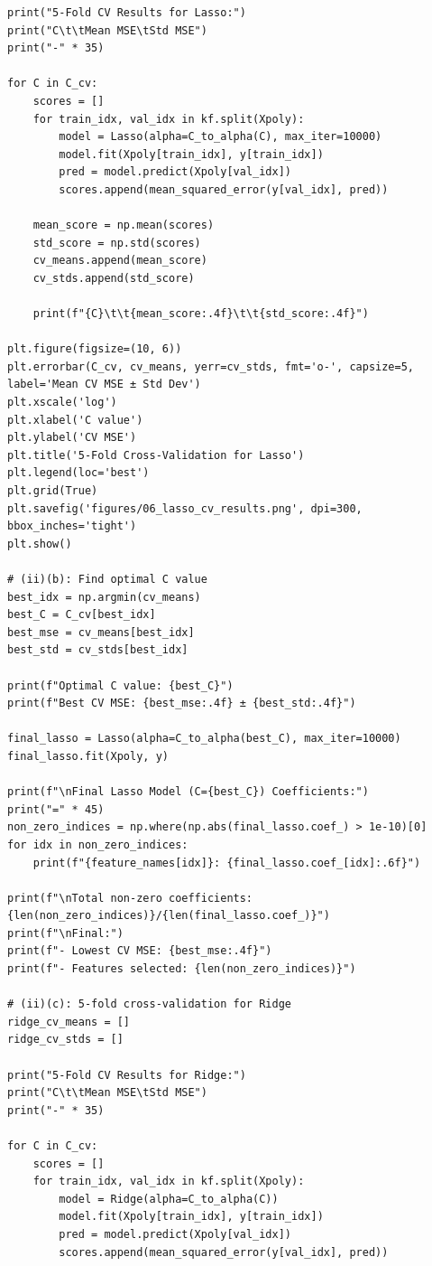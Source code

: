 \documentclass[11pt,a4paper]{article}
\begin{document}
\begin{lstlisting}
print("5-Fold CV Results for Lasso:")
print("C\t\tMean MSE\tStd MSE")
print("-" * 35)

for C in C_cv:
    scores = []
    for train_idx, val_idx in kf.split(Xpoly):
        model = Lasso(alpha=C_to_alpha(C), max_iter=10000)
        model.fit(Xpoly[train_idx], y[train_idx])
        pred = model.predict(Xpoly[val_idx])
        scores.append(mean_squared_error(y[val_idx], pred))
    
    mean_score = np.mean(scores)
    std_score = np.std(scores)
    cv_means.append(mean_score)
    cv_stds.append(std_score)
    
    print(f"{C}\t\t{mean_score:.4f}\t\t{std_score:.4f}")

plt.figure(figsize=(10, 6))
plt.errorbar(C_cv, cv_means, yerr=cv_stds, fmt='o-', capsize=5, label='Mean CV MSE ± Std Dev')
plt.xscale('log')
plt.xlabel('C value')
plt.ylabel('CV MSE')
plt.title('5-Fold Cross-Validation for Lasso')
plt.legend(loc='best')
plt.grid(True)
plt.savefig('figures/06_lasso_cv_results.png', dpi=300, bbox_inches='tight')
plt.show()

# (ii)(b): Find optimal C value
best_idx = np.argmin(cv_means)
best_C = C_cv[best_idx]
best_mse = cv_means[best_idx]
best_std = cv_stds[best_idx]

print(f"Optimal C value: {best_C}")
print(f"Best CV MSE: {best_mse:.4f} ± {best_std:.4f}")

final_lasso = Lasso(alpha=C_to_alpha(best_C), max_iter=10000)
final_lasso.fit(Xpoly, y)

print(f"\nFinal Lasso Model (C={best_C}) Coefficients:")
print("=" * 45)
non_zero_indices = np.where(np.abs(final_lasso.coef_) > 1e-10)[0]
for idx in non_zero_indices:
    print(f"{feature_names[idx]}: {final_lasso.coef_[idx]:.6f}")

print(f"\nTotal non-zero coefficients: {len(non_zero_indices)}/{len(final_lasso.coef_)}")
print(f"\nFinal:")
print(f"- Lowest CV MSE: {best_mse:.4f}")
print(f"- Features selected: {len(non_zero_indices)}")

# (ii)(c): 5-fold cross-validation for Ridge
ridge_cv_means = []
ridge_cv_stds = []

print("5-Fold CV Results for Ridge:")
print("C\t\tMean MSE\tStd MSE")
print("-" * 35)

for C in C_cv:
    scores = []
    for train_idx, val_idx in kf.split(Xpoly):
        model = Ridge(alpha=C_to_alpha(C))
        model.fit(Xpoly[train_idx], y[train_idx])
        pred = model.predict(Xpoly[val_idx])
        scores.append(mean_squared_error(y[val_idx], pred))
    

\end{lstlisting}
\end{document}
